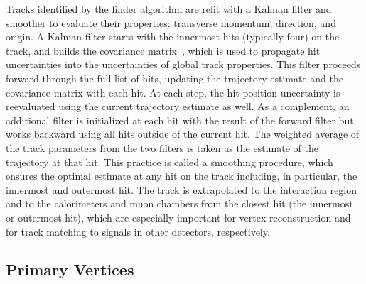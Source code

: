 Tracks identified by the finder algorithm are refit with a Kalman filter and smoother to evaluate their properties:
transverse momentum, direction, and origin.
A Kalman filter starts with the innermost hits (typically four) on the track, 
and builds the covariance matrix~\cite{Strandlie:927379}, 
which is used to propagate hit uncertainties into the uncertainties of global track properties. 
This filter proceeds forward through the full list of hits, 
updating the trajectory estimate and the covariance matrix with each hit.
At each step, the hit position uncertainty is reevaluated using the current trajectory estimate as well. 
As a complement, an additional filter is initialized at each hit with the result of the forward filter 
but works backward using all hits outside of the current hit. 
The weighted average of the track parameters from the two filters is taken as the estimate of the trajectory at that hit.
This practice is called a smoothing procedure, which ensures the optimal estimate at any hit on the track
including, in particular, the innermost and outermost hit.
The track is extrapolated to the interaction region and to the calorimeters and muon chambers from the closest hit (the innermost or outermost hit),
which are especially important for vertex reconstruction and for track matching to signals in other detectors, respectively.


\subsection{Primary Vertices}\label{sec:reco_pv}

